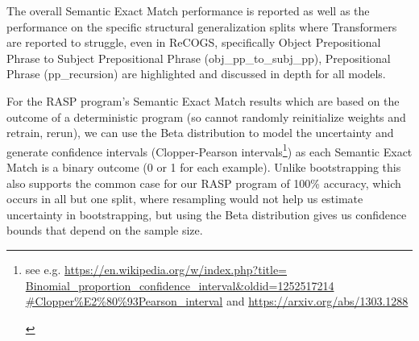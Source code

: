 \documentclass[11pt]{article}
\begin{document}
The overall Semantic Exact Match performance is reported as well as the performance on the specific structural generalization splits where Transformers are reported to struggle, even in ReCOGS, specifically Object Prepositional Phrase to Subject Prepositional Phrase (obj\_pp\_to\_subj\_pp),
Prepositional Phrase (pp\_recursion) are highlighted and discussed in depth for all models.

For the RASP program's Semantic Exact Match results which are based on the outcome of a deterministic program (so cannot randomly reinitialize weights and retrain, rerun),
we can use the Beta distribution to model the uncertainty and generate confidence intervals (Clopper-Pearson intervals\footnote{\begin{footnotesize}see e.g. \href{https://en.wikipedia.org/w/index.php?title=Binomial\_proportion\_confidence\_interval\&oldid=1252517214\#Clopper\%E2\%80\%93Pearson\_interval}{https://en.wikipedia.org/w/index.php?title=
Binomial\_proportion\_confidence\_interval\&oldid=1252517214
\#Clopper\%E2\%80\%93Pearson\_interval}
and
\href{https://arxiv.org/abs/1303.1288}{https://arxiv.org/abs/1303.1288} 
\end{footnotesize}
}) as each Semantic Exact Match is a binary outcome (0 or 1 for each example). Unlike bootstrapping this also supports the common case for our RASP program of 100\% accuracy, which occurs in all but one split, where resampling would not help us estimate uncertainty in bootstrapping, but using the Beta distribution gives us confidence bounds that depend on the sample size.
\end{document}
